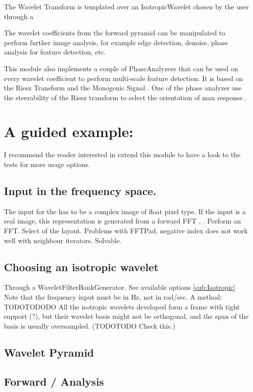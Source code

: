\documentclass{InsightArticle}
\theoremstyle{definition}
\begin{document}
The Wavelet Transform is templated over an IsotropicWavelet chosen by the user through a 

The wavelet coefficients from the forward pyramid can be manipulated to perform further image analysis, for example edge detection, denoise, phase analysis for feature detection, etc.

This module also implements a couple of PhaseAnalyzers that can be used on every wavelet coefficient to perform multi-scale feature detection. It is based on the Riesz Transform and the Monogenic Signal \cite{felsberg_monogenic_2001,unser_multiresolution_2009}.
One of the phase analyzer use the steerability of the Riesz transform to select the orientation of max response \cite{held_steerable_2010,unser_steerable_2011}.

\section{A guided example:}
I recommend the reader interested in extend this module to have a look to the tests for more usage options.
\subsection{Input in the frequency space.}
The input for the  has to be a complex image of float pixel type. If the input is a real image, this representation is generated from a forward FFT , .
Perform an FFT. Select of the layout.
Problems with FFTPad, negative index does not work well with neighbour iterators. Solvable.
\subsection{Choosing an isotropic wavelet}
\label{sub:Choosing}
Through a WaveletFilterBankGenerator. See available options \ref{sub:Isotropic}
Note that the frequency input must be in Hz, not in rad/sec. A method: TODOTODODO
All the isotropic wavelets developed form a frame with tight support (?), but their wavelet basis might not be orthogonal, and the span of the basis is usually oversampled. (TODOTODO Check this.)
\subsection{Wavelet Pyramid}
\label{sub:Pyramid}

\subsection{Forward / Analysis}
\label{sub:Forward}
\end{document}
